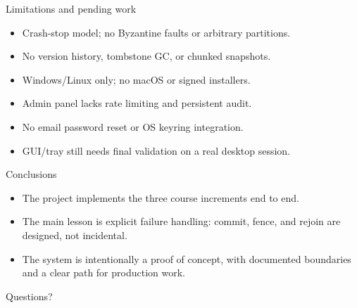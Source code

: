 \documentclass[aspectratio=169]{beamer}
\begin{document}
\begin{frame}{Limitations and pending work}
  \begin{itemize}
    \item Crash-stop model; no Byzantine faults or arbitrary partitions.
    \item No version history, tombstone GC, or chunked snapshots.
    \item Windows/Linux only; no macOS or signed installers.
    \item Admin panel lacks rate limiting and persistent audit.
    \item No email password reset or OS keyring integration.
    \item GUI/tray still needs final validation on a real desktop session.
  \end{itemize}
\end{frame}

\begin{frame}{Conclusions}
  \begin{itemize}
    \item The project implements the three course increments end to end.
    \item The main lesson is explicit failure handling: commit, fence, and
      rejoin are designed, not incidental.
    \item The system is intentionally a proof of concept, with documented
      boundaries and a clear path for production work.
  \end{itemize}
  \vspace{0.4cm}
  \centering
  \Large Questions?
\end{frame}
\end{document}
